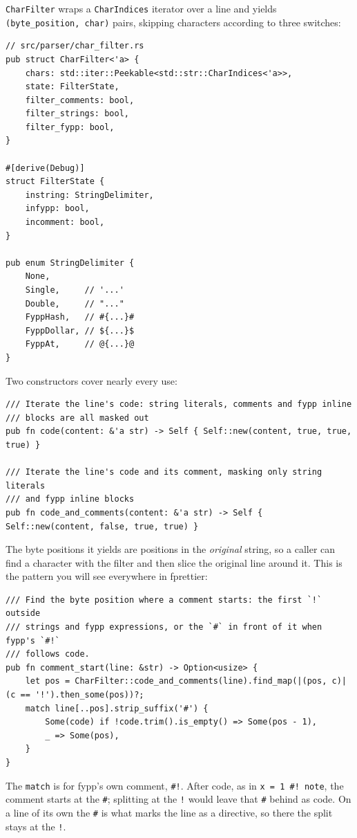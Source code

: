 \documentclass[11pt,a4paper,openany]{book}
\newcommand{\code}[1]{\texttt{\small #1}}
\begin{document}
\code{CharFilter} wraps a \code{CharIndices} iterator over a line and yields
\code{(byte\_position, char)} pairs, skipping characters according to three
switches:

\begin{lstlisting}[style=rust]
// src/parser/char_filter.rs
pub struct CharFilter<'a> {
    chars: std::iter::Peekable<std::str::CharIndices<'a>>,
    state: FilterState,
    filter_comments: bool,
    filter_strings: bool,
    filter_fypp: bool,
}

#[derive(Debug)]
struct FilterState {
    instring: StringDelimiter,
    infypp: bool,
    incomment: bool,
}

pub enum StringDelimiter {
    None,
    Single,     // '...'
    Double,     // "..."
    FyppHash,   // #{...}#
    FyppDollar, // ${...}$
    FyppAt,     // @{...}@
}
\end{lstlisting}

Two constructors cover nearly every use:

\begin{lstlisting}[style=rust]
/// Iterate the line's code: string literals, comments and fypp inline
/// blocks are all masked out
pub fn code(content: &'a str) -> Self { Self::new(content, true, true, true) }

/// Iterate the line's code and its comment, masking only string literals
/// and fypp inline blocks
pub fn code_and_comments(content: &'a str) -> Self { Self::new(content, false, true, true) }
\end{lstlisting}

The byte positions it yields are positions in the \emph{original} string, so a
caller can find a character with the filter and then slice the original line
around it. This is the pattern you will see everywhere in fprettier:

\begin{lstlisting}[style=rust]
/// Find the byte position where a comment starts: the first `!` outside
/// strings and fypp expressions, or the `#` in front of it when fypp's `#!`
/// follows code.
pub fn comment_start(line: &str) -> Option<usize> {
    let pos = CharFilter::code_and_comments(line).find_map(|(pos, c)| (c == '!').then_some(pos))?;
    match line[..pos].strip_suffix('#') {
        Some(code) if !code.trim().is_empty() => Some(pos - 1),
        _ => Some(pos),
    }
}
\end{lstlisting}

The \code{match} is for fypp's own comment, \code{\#!}. After code, as in
\code{x = 1 \#! note}, the comment starts at the \code{\#}; splitting at the
\code{!} would leave that \code{\#} behind as code. On a line of its own the
\code{\#} is what marks the line as a directive, so there the split stays at
the \code{!}.
\end{document}
